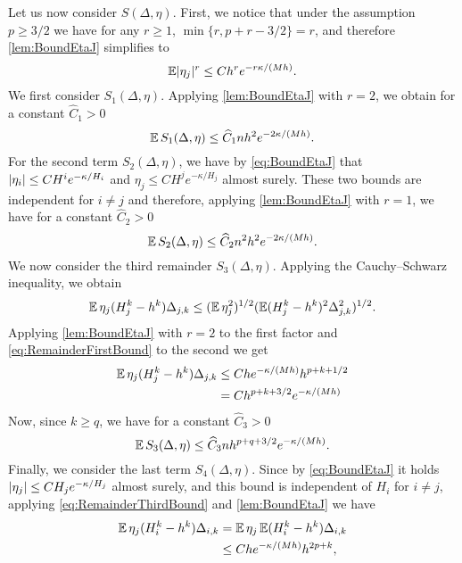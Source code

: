 \documentclass[10pt]{article}
\begin{document}
	Let us now consider $S(\Delta, \eta)$. First, we notice that under the assumption $p \geq 3/2$ we have for any $r \geq 1$, $\min\{r, p+r-3/2\} = r$, and therefore \cref{lem:BoundEtaJ} simplifies to 
	\begin{equation}
		\operatorname{\mathbb{E}}\lvert\eta_j\rvert^r \leq Ch^r e^{-r\kappa/(Mh)}.
	\end{equation}
	We first consider $S_1(\Delta, \eta)$. Applying \cref{lem:BoundEtaJ} with $r = 2$, we obtain for a constant $\hat C_1 > 0$ 
	\begin{equation}
		\operatorname{\mathbb{E}} S_1(\Delta, \eta) \leq \widehat C_1 n h^2 e^{-2\kappa/(Mh)}.
	\end{equation}
	For the second term $S_2(\Delta, \eta)$, we have {by \eqref{eq:BoundEtaJ}} that $\lvert\eta_i\rvert\leq CH^i e^{-\kappa/H_i}$ and $\eta_j\leq CH^j e^{-\kappa/H_j}$ almost surely. These two bounds are independent for $i \neq j$ and therefore, applying \cref{lem:BoundEtaJ} with $r = 1$, we have for a constant $\hat C_2 > 0$
	\begin{equation}
		\operatorname{\mathbb{E}} S_2(\Delta, \eta) \leq \widehat C_2 n^2 h^2 e^{-2\kappa/(Mh)}.
	\end{equation}
	We now consider the third remainder $S_3(\Delta, \eta)$. Applying the Cauchy--Schwarz inequality, we obtain
	\begin{equation}
		\operatorname{\mathbb{E}} \eta_j (H_j^k - h^k) \Delta_{j,k} \leq (\operatorname{\mathbb{E}}\eta_j^2)^{1/2} (\operatorname{\mathbb{E}}(H_j^k - h^k)^2 \Delta_{j,k}^2)^{1/2}.
	\end{equation}
	Applying \cref{lem:BoundEtaJ} with $r = 2$ to the first factor and \eqref{eq:RemainderFirstBound} to the second we get
	\begin{equation}
	\begin{aligned}
		\operatorname{\mathbb{E}} \eta_j (H_j^k - h^k) \Delta_{j,k} &\leq C h e^{-\kappa/(Mh)}h^{p+k+1/2}\\
		&= C h^{p+k+3/2}e^{-\kappa/(Mh)}
	\end{aligned}
	\end{equation}
	Now, since $k \geq q$, we have for a constant $\hat C_3 > 0$
	\begin{equation}
		\operatorname{\mathbb{E}} S_3(\Delta, \eta) \leq \widehat C_3 n h^{p+q+3/2}e^{-\kappa/(Mh)}. 
	\end{equation}
	Finally, we consider the last term $S_4(\Delta, \eta)$. Since {by \eqref{eq:BoundEtaJ} it holds $\lvert\eta_j\rvert \leq CH_j e^{-\kappa/H_j}$} almost surely, and this bound is independent of $H_i$ for $i \neq j$, applying \eqref{eq:RemainderThirdBound} and \cref{lem:BoundEtaJ} we have
	\begin{equation}
	\begin{aligned}
		\operatorname{\mathbb{E}}\eta_j(H_i^k - h^k)\Delta_{i,k} &= \operatorname{\mathbb{E}}\eta_j \operatorname{\mathbb{E}} (H_i^k - h^k)\Delta_{i,k}\\
		&\leq Ch e^{-\kappa/(Mh)}h^{2p+k},
	\end{aligned}
	\end{equation}
\end{document}
